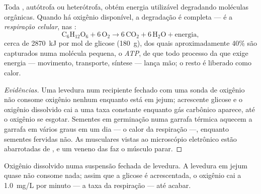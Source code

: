\begin{proposition}\label{prop:g10:cell-metabolism:respiration}
Toda , autótrofa ou heterótrofa, obtém energia utilizável
degradando moléculas orgânicas. Quando há oxigênio disponível, a
degradação é completa --- é a \emph{respiração celular},
nas :
\[
\mathrm{C_6H_{12}O_6} + 6\,\mathrm{O_2} \longrightarrow
6\,\mathrm{CO_2} + 6\,\mathrm{H_2O} + \text{energia},
\]
cerca de \qty{2870}{kJ} por mol de glicose (\qty{180}{g}), dos quais
aproximadamente 40\% são capturados numa molécula pequena, o
\emph{ATP}, de que todo processo da  que exige energia
--- movimento, transporte, síntese --- lança mão; o resto é liberado
como calor.
\end{proposition}
\begin{proof}[Evidências]
Uma levedura num recipiente fechado com uma sonda de oxigênio não
consome oxigênio nenhum enquanto está em jejum; acrescente glicose e o
oxigênio dissolvido cai a uma taxa constante enquanto gás carbônico
aparece, até o oxigênio se esgotar. Sementes em germinação numa garrafa
térmica aquecem a garrafa em vários graus em um dia --- o calor da
respiração ---, enquanto sementes fervidas não. As  musculares
vistas ao microscópio eletrônico estão abarrotadas de , e
um veneno das  faz o músculo parar.
\end{proof}

\begin{omfigure}

{\small Oxigênio dissolvido numa suspensão fechada de levedura. A
levedura em jejum quase não consome nada; assim que a glicose é
acrescentada, o oxigênio cai a \qty{1.0}{mg/L} por minuto --- a taxa da
respiração --- até acabar.}
\end{omfigure}

